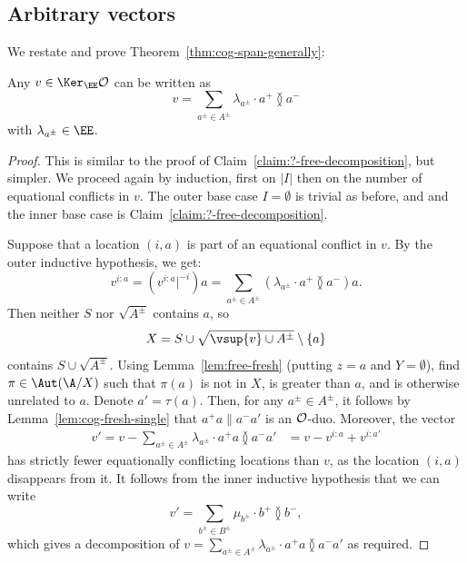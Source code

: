 \subsection{Arbitrary vectors}
We restate and prove Theorem~\ref{thm:cog-span-generally}:
\begin{theorem}
    Any $v \in \Ker_\EE \cal O$ can be written as
    \[
        v = \sum_{a^\pm \in A^\pm} \lambda_{a^\pm} \cdot a^+ \between a^-
    \]
    with $\lambda_{a^\pm} \in \EE$.
\end{theorem}
\begin{proof}
This is similar to the proof of Claim~\ref{claim:?-free-decomposition}, but simpler.
We proceed again by induction, first on $|I|$ then on the number of equational conflicts in $v$.
The outer base case $I = \emptyset$ is trivial as before, and 
and the inner base case is Claim~\ref{claim:?-free-decomposition}.

Suppose that a location $(i, a)$ is part of an equational conflict in $v$. By the outer inductive hypothesis, we get:
\[
    v^{i:a}
    = (v^{i:a}|^{-i}) a 
    = \sum_{a^\pm\in A^\pm} (\lambda_{a^\pm} \cdot a^+ \between a^-) a.
\]
Then neither $S$ nor $\sqrt{A^\pm}$ contains $a$,
so 
\[
X = S \cup \sqrt{\vsup{v} \cup A^\pm} \setminus \{a\}
\]
contains $S \cup \sqrt{A^\pm}$.
Using Lemma~\ref{lem:free-fresh} (putting $z=a$ and $Y=\emptyset$), find $\pi \in \Aut(\A/X)$ such that $\pi(a)$ is not in $X$, is greater than $a$, and is otherwise unrelated to $a$. Denote $a'=\tau(a)$. 
Then, for any $a^\pm \in A^\pm$, it follows by Lemma~\ref{lem:cog-fresh-single} that $a^+ a \parallel a^- a'$ is an $\cal O$-duo. Moreover, 
the vector
\begin{align*}
    v' = v - \sum_{a^\pm\in A^\pm} \lambda_{a^\pm} \cdot a^+ a \between a^- a'
    &= v -  v^{i:a} + v^{i:a'} 
\end{align*}
has strictly fewer equationally conflicting locations than $v$, as the location $(i,a)$ disappears from it.
It follows from the inner inductive hypothesis that we can write
\[
    v' = \sum_{b^\pm \in B^\pm} \mu_{b^\pm} \cdot b^+ \between b^-,
\]
which gives a decomposition of $v = \sum_{a^\pm \in A^\pm} \lambda_{a^\pm} \cdot a^+ a \between a^- a'$ as required.
\end{proof}